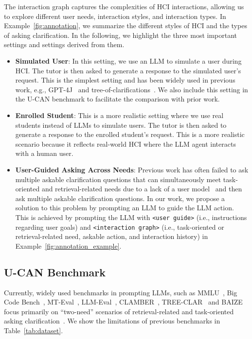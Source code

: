 The interaction graph captures the complexities of HCI interactions, allowing us to explore different user needs, interaction styles, and interaction types.
In Example~\ref{fig:annotation}, we summarize the different styles of HCI and the types of asking clarification.
In the following, we highlight the three most important settings and settings derived from them.
\begin{itemize}[leftmargin=0.5cm,topsep=-0.8\parskip,noitemsep,nolistsep]
    \item \textbf{Simulated User}: In this setting, we use an LLM to simulate a user during HCI. The tutor is then asked to generate a response to the simulated user's request. This is the simplest setting and has been widely used in previous work, e.g., GPT-4J~\citep{rethink_rephrase} and tree-of-clarifications~\citep{tree_of_clarifications}. We also include this setting in the U-CAN benchmark to facilitate the comparison with prior work.
    \item \textbf{Enrolled Student}: This is a more realistic setting where we use real students instead of LLMs to simulate users. The tutor is then asked to generate a response to the enrolled student's request. This is a more realistic scenario because it reflects real-world HCI where the LLM agent interacts with a human user.
    \item \textbf{User-Guided Asking Across Needs}: Previous work has often failed to ask multiple askable clarification questions that can simultaneously meet task-oriented and retrieval-related needs due to a lack of a user model~\citep{clarinet,tree_of_clarifications,proactive_cot} and then ask multiple askable clarification questions.
    In our work, we propose a solution to this problem by prompting an LLM to guide the LLM action. This is achieved by prompting the LLM with \colorbox{commentcolor}{\texttt{<user guide>}} (i.e., instructions regarding user goals) and \colorbox{answercolor}{\texttt{<interaction graph>}} (i.e., task-oriented or retrieval-related need, askable action, and interaction history) in Example~\ref{fig:annotation_example}.
\end{itemize}

\subsection{U-CAN Benchmark}
\label{subsec:u_can}

Currently, widely used benchmarks in prompting LLMs, such as MMLU~\cite{math}, Big Code Bench~\cite{bigcodebench}, MT-Eval~\cite{mteval}, LLM-Eval~\cite{llm_as_judge}, CLAMBER~\citep{clamber}, TREE-CLAR~\citep{tree_of_clarification} and BAIZE~\citep{baize} focus primarily on ``two-need'' scenarios of retrieval-related and task-oriented asking clarification~\citep{clarinet,tree_of_clarifications,proactive_cot}.
We show the limitations of previous benchmarks in Table~\ref{tab:dataset}.

